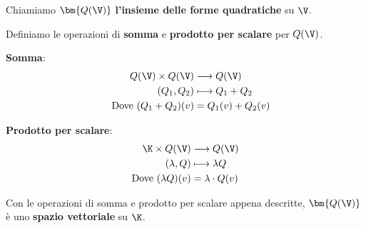 \documentclass[11pt, a4paper, titlepage, oneside]{scrbook}
\begin{document}
\begin{Definizione}
\label{def-insieme-forme-quadratiche}
Chiamiamo  $\bm{Q(\V)}$ \textbf{l'insieme delle forme quadratiche} su $\V$.
\end{Definizione}

Definiamo le operazioni di \textbf{somma} e \textbf{prodotto per scalare} per $Q(\V)$.

\bigskip

\begin{minipage}[c]{0.45\textwidth}
    \centering
    {\Large\textbf{Somma}:}
    \begin{align*}
        \hspace{0.4cm}Q(\V) \times Q(\V) &\longrightarrow Q(\V) \\
        \hspace{0.4cm}(Q_1,Q_2) &\longmapsto Q_1 + Q_2 \\
        \hspace{0.4cm}\text{Dove } (Q_1 + Q_2)(v) &= Q_1(v) + Q_2(v)
    \end{align*}
\end{minipage}
\begin{minipage}[c]{0.45\textwidth}
    \centering
    {\Large\textbf{Prodotto per scalare}:}
    \begin{align*}
        \K \times Q(\V) &\longrightarrow Q(\V) \\
        (\lambda,Q) &\longmapsto \lambda Q \\
        \text{Dove } (\lambda Q)(v) &= \lambda \cdot Q(v)
    \end{align*}
\end{minipage}

\bigskip

\begin{Proposizione}[]
\label{propos-insieme-forme-quadratiche-spazio-vett}
Con le operazioni di somma e prodotto per scalare appena descritte, $\bm{Q(\V)}$ è uno \textbf{spazio vettoriale} su $\K$.
\end{Proposizione}

\Dimostrazione \nopagebreak
\end{document}
